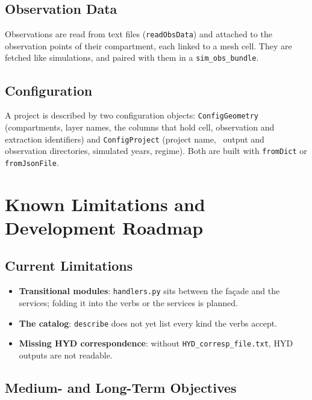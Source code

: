 \subsection{Observation Data}

Observations are read from text files (\texttt{readObsData}) and attached to
the observation points of their compartment, each linked to a mesh cell. They
are fetched like simulations, and paired with them in a
\texttt{sim\_obs\_bundle}.

\subsection{Configuration}

A project is described by two configuration objects: \texttt{ConfigGeometry}
(compartments, layer names, the columns that hold cell, observation and
extraction identifiers) and \texttt{ConfigProject} (project name, \cw\ output
and observation directories, simulated years, regime). Both are built with
\texttt{fromDict} or \texttt{fromJsonFile}.


\section{Known Limitations and Development Roadmap}

\subsection{Current Limitations}

\begin{itemize}
    \item \textbf{Transitional modules}: \texttt{handlers.py} sits between the façade and the services; folding it into the verbs or the services is planned.
    \item \textbf{The catalog}: \texttt{describe} does not yet list every kind the verbs accept.
    \item \textbf{Missing HYD correspondence}: without \texttt{HYD\_corresp\_file.txt}, HYD outputs are not readable.
\end{itemize}

\subsection{Medium- and Long-Term Objectives}


